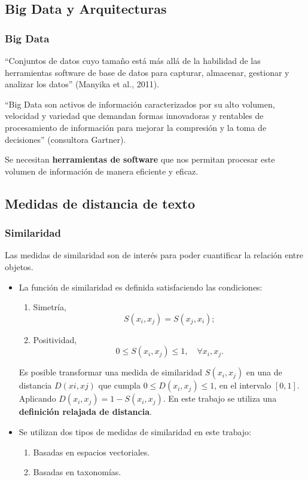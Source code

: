 \subsection{Big Data y Arquitecturas}
\begin{frame}
	\frametitle{Big Data}
		\begin{tcolorbox}[colback=blue!5,colframe=blue!40!black,title=Big Data]
			``Conjuntos de datos cuyo tamaño está más allá de la habilidad de las herramientas software de base de datos para capturar, almacenar, gestionar y analizar los datos'' (Manyika et al., 2011).

			\bigskip

			``Big Data son activos de información caracterizados por su alto volumen, velocidad y variedad que demandan formas innovadoras y rentables de procesamiento de información para mejorar la compresión y la toma de decisiones'' (consultora Gartner).
		\end{tcolorbox}
		\bigskip

		\begin{center}
			Se necesitan \textbf{herramientas de software} que nos permitan procesar este volumen de información de manera eficiente y eficaz.
		\end{center}
\end{frame}

\subsection{Medidas de distancia de texto}
\begin{frame}
	\frametitle{Similaridad}
	Las medidas de similaridad son de interés para poder cuantificar la relación entre objetos.
	\bigskip
	\begin{itemize}
		\item
		La función de similaridad es definida satisfaciendo las condiciones:
		\begin{enumerate}[<*>]
			\item Simetría,
			\[S(x_i,x_j)=S(x_j,x_i);\]

			\item Positividad,
			\[0 \leq S(x_i,x_j) \leq 1, \quad \forall x_i,x_j.\]
		\end{enumerate}
		\medskip
		Es posible transformar una medida de similaridad \(S(x_i,x_j)\) en una de distancia \(D(xi,xj)\) que cumpla \(0 \leq D(x_i,x_j) \leq 1\), en el intervalo \([0,1]\). Aplicando \(D(x_i,x_j) = 1 - S(x_i,x_j)\). En este trabajo se utiliza una \textbf{definición relajada de distancia}.

		\bigskip

		\item Se utilizan dos tipos de medidas de similaridad en este trabajo:
		\begin{enumerate}[<*>]
			\item Basadas en espacios vectoriales.
			\item Basadas en taxonomías.
		\end{enumerate}
	\end{itemize}
\end{frame}

